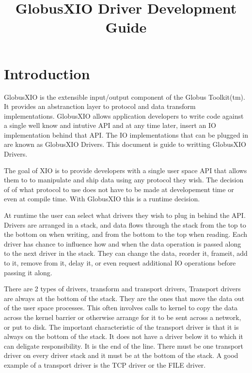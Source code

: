 \documentclass[11pt]{article}
\title{GlobusXIO Driver Development Guide}
\begin{document}
\maketitle

\section{Introduction}
GlobusXIO is the extensible input/output component of the Globus Toolkit(tm).
It provides an abstranction layer to protocol and data transform
implementations.  GlobusXIO allows application developers to write
code against a single well know and intutive API and at any time later,
insert an IO implementation behind that API.  The IO implementations
that can be plugged in are known as GlobusXIO Drivers.  This document is 
guide to writting GlobusXIO Drivers.

The goal of XIO is to provide developers with a single user space API
that allows them to to manipulate and ship data using any protocol they
wish.  The decision of of what protocol to use does not have to be made
at developement time or even at compile time.  With GlobusXIO this is
a runtime decision.  

At runtime the user can select what drivers they wish to plug in behind the
API.  Drivers are arranged in a stack, and data flows through the stack
from the top to the bottom on when writing, and from the bottom to the
top when reading.  Each driver has chance to influence how and when
the data operation is passed along to the next driver in the stack.  
They can change the data, reorder it, frameit, add to it, remove from it,
delay it, or even request additional IO operations before passing it along.

There are 2 types of drivers, transform and transport drivers,
Transport drivers are always at the bottom of the stack.  They are 
the ones that move the data out of the user space processes.  This
often involves calls to kernel to copy the data across the kernel
barrier or otherwise arrange for it to be sent across a network, or
put to disk.  The important characteristic of the transport driver is
that it is always on the bottom of the stack.  It does not have
a driver below it to which it can deligate responsibility.  It is
the end of the line.  There must be one transport driver on every driver
stack and it must be at the bottom of the stack.  A good example of
a transport driver is the TCP driver or the FILE driver.
\end{document}
